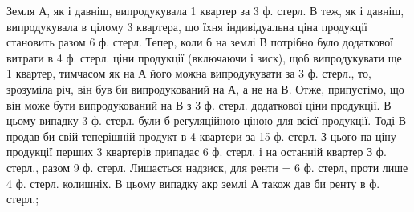 Земля $А$, як і давніш, випродукувала 1 квартер за 3 ф. стерл. $В$ теж,
як і давніш, випродукувала в цілому 3 квартера, що їхня індивідуальна ціна
продукції становить разом 6 ф. стерл. Тепер, коли б на землі $В$ потрібно було
додаткової витрати в 4 ф. стерл. ціни продукції (включаючи і зиск), щоб випродукувати ще 1 квартер,
тимчасом як на $А$ його можна випродукувати за
3 ф. стерл., то, зрозуміла річ, він був би випродукований на $А$, а не на $В$.
Отже, припустімо, що він може бути випродукований на $В$ з 3 ф. стерл.
додаткової ціни продукції. В цьому випадку 3  ф. стерл. були б регуляційною ціною
для всієї продукції. Тоді $В$ продав би свій теперішній продукт в 4  квартери за
15  ф. стерл. З цього па ціну продукції перших 3  квартерів припадає
6 ф. стерл. і на останній квартер З  ф. стерл., разом 9  ф. стерл. Лишається
надзиск, для ренти = 6  ф. стерл, проти лише 4  ф. стерл. колишніх.
В цьому випадку акр землі $А$ також дав би ренту в    ф. стерл.;
\parbreak{}  %
